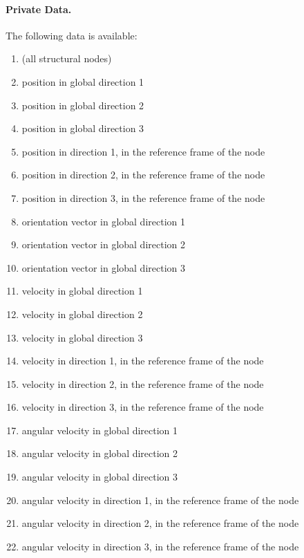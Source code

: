 \paragraph{Private Data.}
\label{sec:NODE:STRUCTURAL:PRIV}
The following data is available:
\begin{enumerate}
\item[] (all structural nodes)
\item {} position in global direction 1
\item {} position in global direction 2
\item {} position in global direction 3
\item {} position in direction 1, in the reference frame of the node
\item {} position in direction 2, in the reference frame of the node
\item {} position in direction 3, in the reference frame of the node
\item {} orientation vector in global direction 1
\item {} orientation vector in global direction 2
\item {} orientation vector in global direction 3
\item {} velocity in global direction 1
\item {} velocity in global direction 2
\item {} velocity in global direction 3
\item {} velocity in direction 1, in the reference frame of the node
\item {} velocity in direction 2, in the reference frame of the node
\item {} velocity in direction 3, in the reference frame of the node
\item {} angular velocity in global direction 1
\item {} angular velocity in global direction 2
\item {} angular velocity in global direction 3
\item {} angular velocity in direction 1, in the reference frame of the node
\item {} angular velocity in direction 2, in the reference frame of the node
\item {} angular velocity in direction 3, in the reference frame of the node

\end{enumerate}
